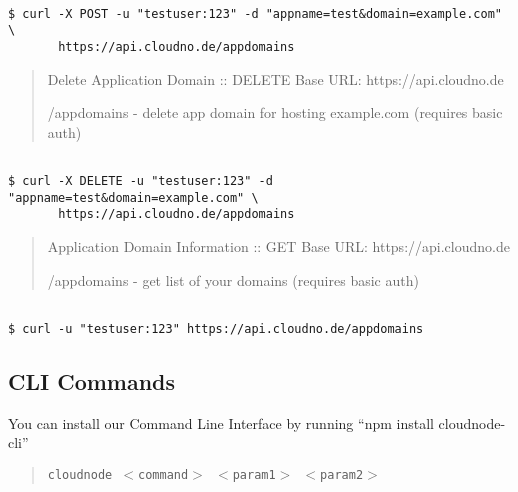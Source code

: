 \begin{adjustwidth}{2.5em}{2.5em}
\begin{verbatim}

$ curl -X POST -u "testuser:123" -d "appname=test&domain=example.com" \
       https://api.cloudno.de/appdomains

\end{verbatim}
\end{adjustwidth}

\begin{quote}

Delete Application Domain :: DELETE
Base URL: https:/\slash api.cloudno.de

\slash appdomains - delete app domain for hosting example.com (requires basic auth)
\end{quote}

\begin{adjustwidth}{2.5em}{2.5em}
\begin{verbatim}

$ curl -X DELETE -u "testuser:123" -d "appname=test&domain=example.com" \
       https://api.cloudno.de/appdomains

\end{verbatim}
\end{adjustwidth}

\begin{quote}

Application Domain Information :: GET
Base URL: https:/\slash api.cloudno.de

\slash appdomains - get list of your domains (requires basic auth)
\end{quote}

\begin{adjustwidth}{2.5em}{2.5em}
\begin{verbatim}

$ curl -u "testuser:123" https://api.cloudno.de/appdomains

\end{verbatim}
\end{adjustwidth}



\subsection{CLI Commands}
\label{clicommands}

You can install our Command Line Interface by running ``npm install cloudnode-cli''

\begin{quote}

\texttt{cloudnode $<$command$>$ $<$param1$>$ $<$param2$>$}
\end{quote}

